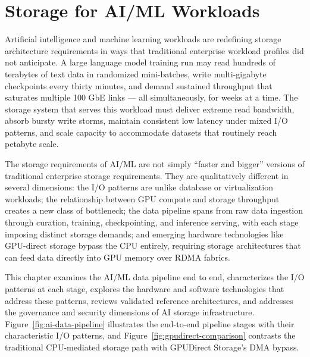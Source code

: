 \chapter{Storage for AI/ML Workloads}
\label{ch:18}

Artificial intelligence and machine learning workloads are redefining storage architecture requirements in ways that traditional enterprise workload profiles did not anticipate. A large language model training run may read hundreds of terabytes of text data in randomized mini-batches, write multi-gigabyte checkpoints every thirty minutes, and demand sustained throughput that saturates multiple 100 GbE links --- all simultaneously, for weeks at a time. The storage system that serves this workload must deliver extreme read bandwidth, absorb bursty write storms, maintain consistent low latency under mixed I/O patterns, and scale capacity to accommodate datasets that routinely reach petabyte scale.

The storage requirements of AI/ML are not simply ``faster and bigger'' versions of traditional enterprise storage requirements. They are qualitatively different in several dimensions: the I/O patterns are unlike database or virtualization workloads; the relationship between GPU compute and storage throughput creates a new class of bottleneck; the data pipeline spans from raw data ingestion through curation, training, checkpointing, and inference serving, with each stage imposing distinct storage demands; and emerging hardware technologies like GPU-direct storage bypass the CPU entirely, requiring storage architectures that can feed data directly into GPU memory over RDMA fabrics.

This chapter examines the AI/ML data pipeline end to end, characterizes the I/O patterns at each stage, explores the hardware and software technologies that address these patterns, reviews validated reference architectures, and addresses the governance and security dimensions of AI storage infrastructure. Figure~\ref{fig:ai-data-pipeline} illustrates the end-to-end pipeline stages with their characteristic I/O patterns, and Figure~\ref{fig:gpudirect-comparison} contrasts the traditional CPU-mediated storage path with GPUDirect Storage's DMA bypass.

